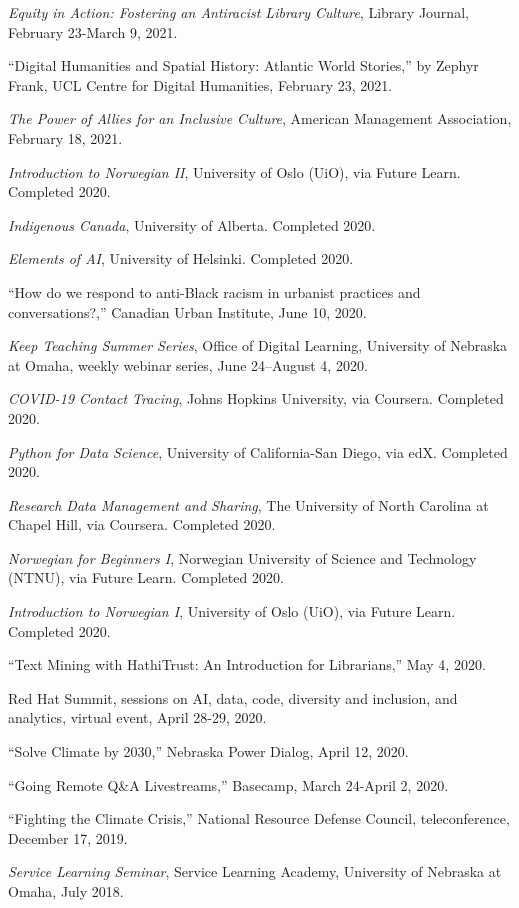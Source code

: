 \emph{Equity in Action: Fostering an Antiracist Library Culture},
Library Journal, February 23-March 9, 2021.

``Digital Humanities and Spatial History: Atlantic World Stories,'' by
Zephyr Frank, UCL Centre for Digital Humanities, February 23, 2021.

\emph{The Power of Allies for an Inclusive Culture}, American Management
Association, February 18, 2021.

\emph{Introduction to Norwegian II}, University of Oslo (UiO), via
Future Learn. Completed 2020.

\emph{Indigenous Canada}, University of Alberta. Completed 2020.

\emph{Elements of AI}, University of Helsinki. Completed 2020.

``How do we respond to anti-Black racism in urbanist practices and
conversations?,'' Canadian Urban Institute, June 10, 2020.

\emph{Keep Teaching Summer Series}, Office of Digital Learning,
University of Nebraska at Omaha, weekly webinar series, June 24--August
4, 2020.

\emph{COVID-19 Contact Tracing}, Johns Hopkins University, via Coursera.
Completed 2020.

\emph{Python for Data Science}, University of California-San Diego, via
edX. Completed 2020.

\emph{Research Data Management and Sharing}, The University of North
Carolina at Chapel Hill, via Coursera. Completed 2020.

\emph{Norwegian for Beginners I}, Norwegian University of Science and
Technology (NTNU), via Future Learn. Completed 2020.

\emph{Introduction to Norwegian I}, University of Oslo (UiO), via Future
Learn. Completed 2020.

``Text Mining with HathiTrust: An Introduction for Librarians,'' May 4,
2020.

Red Hat Summit, sessions on AI, data, code, diversity and inclusion, and
analytics, virtual event, April 28-29, 2020.

``Solve Climate by 2030,'' Nebraska Power Dialog, April 12, 2020.

``Going Remote Q\&A Livestreams,'' Basecamp, March 24-April 2, 2020.

``Fighting the Climate Crisis,'' National Resource Defense Council,
teleconference, December 17, 2019.

\emph{Service Learning Seminar}, Service Learning Academy, University of
Nebraska at Omaha, July 2018.


